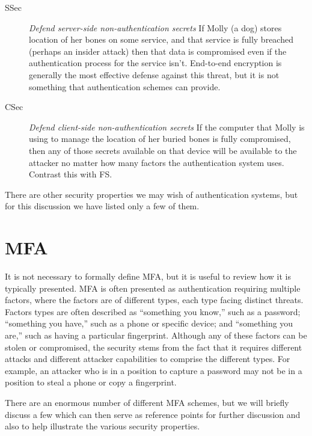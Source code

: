 \documentclass{soups}
\newcommand{\propdescription}[1]{\textit{#1}\newline}
\newcommand{\prop}[1]{\textsf{#1}}
\begin{document}
\begin{description}
  \item[SSec] \propdescription{Defend server-side non-authentication secrets}
    If Molly (a dog) stores location of her bones on some service,
    and that service is fully breached (perhaps an insider attack)
    then that data is compromised even if the authentication process for the service isn't.
    End-to-end encryption is generally the most effective defense against this threat,
    but it is not something that authentication schemes can provide.

  \item[CSec] \propdescription{Defend client-side non-authentication secrets}
    If the computer that Molly is using to manage the location of her buried bones is fully compromised,
    then any of those secrets available on that device will be available to the attacker no matter how many factors the authentication system uses.
    Contrast this with \prop{FS}.
  
\end{description}

There are other security properties we may wish of authentication systems, but for this discussion we have listed only a few of them.

\section{MFA}

It is not necessary to formally define MFA, but it is useful to review how it is typically presented.
MFA is often presented as authentication requiring multiple factors, where the factors are of different types, each type facing distinct threats.
Factors types are often described as “something you know,” such as a password;
“something you have,” such as a phone or specific device;
and “something you are,” such as having a particular fingerprint.
Although any of these factors can be stolen or compromised,
the security stems from the fact that it requires different attacks and different attacker capabilities to comprise the different types.
For example, an attacker who is in a position to capture a password may not be in a position to steal a phone or copy a fingerprint.

There are an enormous number of different MFA schemes,
but we will briefly discuss a few
which can then serve as reference points for further discussion and also to help illustrate the various security properties.
\end{document}

